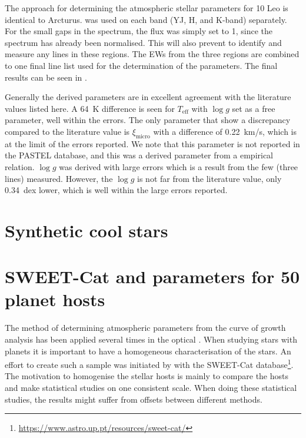 The approach for determining the atmospheric stellar parameters for 10 Leo is identical to Arcturus.
\ARES was used on each band (YJ, H, and K-band) separately. For the small gaps in the spectrum, the
flux was simply set to 1, since the spectrum has already been normalised. This will also prevent
\ARES to identify and measure any lines in these regions. The EWs from the three regions are
combined to one final line list used for the determination of the parameters. The final results can
be seen in .

Generally the derived parameters are in excellent agreement with the literature values listed here.
A \SI{64}{K} difference is seen for $T_\mathrm{eff}$ with $\log g$ set as a free parameter, well
within the errors. The only parameter that show a discrepancy compared to the literature value is
$\xi_\mathrm{micro}$ with a difference of \SI{0.22}{km/s}, which is at the limit of the errors
reported. We note that this parameter is not reported in the PASTEL database, and this was a derived parameter from a empirical relation. $\log g$
was derived with large errors which is a result from the few  (three lines) measured.
However, the $\log g$ is not far from the literature value, only \SI{0.34}{dex} lower, which is well
within the large errors reported.


\section{Synthetic cool stars}
\label{sec:synthetic_spectra}



\section{SWEET-Cat and parameters for 50 planet hosts}
\label{sec:SWEET-Cat}

The method of determining atmospheric parameters from the curve of growth analysis has been applied
several times in the optical \citep[see e.g.][]{Mortier2013b,Tsantaki2013,Sousa2011,Santos2013}.
When studying stars with planets it is important to have a homogeneous characterisation of the
stars. An effort to create such a sample was initiated by \citet{Santos2013} with the SWEET-Cat
database\footnote{\url{https://www.astro.up.pt/resources/sweet-cat/}}. The motivation to homogenise
the stellar hosts is mainly to compare the hosts and make statistical studies on one consistent
scale. When doing these statistical studies, the results might suffer from offsets between different
methods.

